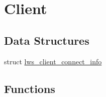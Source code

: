 \hypertarget{group__client}{}\section{Client}
\label{group__client}
\subsection*{Data Structures}
\begin{DoxyCompactItemize}
\item 
struct \hyperlink{structlws__client__connect__info}{lws\+\_\+client\+\_\+connect\+\_\+info}
\end{DoxyCompactItemize}
\subsection*{Functions}
